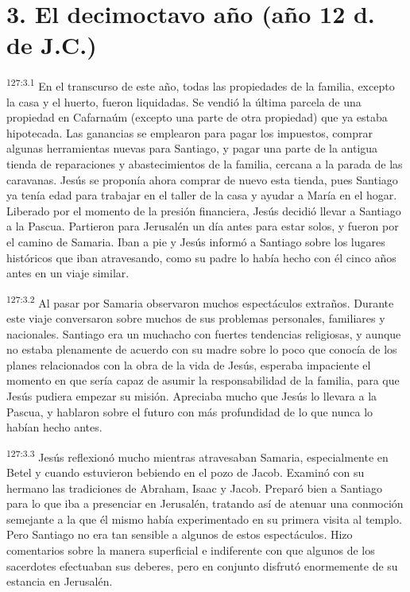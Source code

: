 \section*{3. El decimoctavo año (año 12 d. de J.C.)}
\par
\textsuperscript{127:3.1} En el transcurso de este año, todas las propiedades de la familia, excepto la casa y el huerto, fueron liquidadas. Se vendió la última parcela de una propiedad en Cafarnaúm (excepto una parte de otra propiedad) que ya estaba hipotecada. Las ganancias se emplearon para pagar los impuestos, comprar algunas herramientas nuevas para Santiago, y pagar una parte de la antigua tienda de reparaciones y abastecimientos de la familia, cercana a la parada de las caravanas. Jesús se proponía ahora comprar de nuevo esta tienda, pues Santiago ya tenía edad para trabajar en el taller de la casa y ayudar a María en el hogar. Liberado por el momento de la presión financiera, Jesús decidió llevar a Santiago a la Pascua. Partieron para Jerusalén un día antes para estar solos, y fueron por el camino de Samaria. Iban a pie y Jesús informó a Santiago sobre los lugares históricos que iban atravesando, como su padre lo había hecho con él cinco años antes en un viaje similar.

\par
\textsuperscript{127:3.2} Al pasar por Samaria observaron muchos espectáculos extraños. Durante este viaje conversaron sobre muchos de sus problemas personales, familiares y nacionales. Santiago era un muchacho con fuertes tendencias religiosas, y aunque no estaba plenamente de acuerdo con su madre sobre lo poco que conocía de los planes relacionados con la obra de la vida de Jesús, esperaba impaciente el momento en que sería capaz de asumir la responsabilidad de la familia, para que Jesús pudiera empezar su misión. Apreciaba mucho que Jesús lo llevara a la Pascua, y hablaron sobre el futuro con más profundidad de lo que nunca lo habían hecho antes.

\par
\textsuperscript{127:3.3} Jesús reflexionó mucho mientras atravesaban Samaria, especialmente en Betel y cuando estuvieron bebiendo en el pozo de Jacob. Examinó con su hermano las tradiciones de Abraham, Isaac y Jacob. Preparó bien a Santiago para lo que iba a presenciar en Jerusalén, tratando así de atenuar una conmoción semejante a la que él mismo había experimentado en su primera visita al templo. Pero Santiago no era tan sensible a algunos de estos espectáculos. Hizo comentarios sobre la manera superficial e indiferente con que algunos de los sacerdotes efectuaban sus deberes, pero en conjunto disfrutó enormemente de su estancia en Jerusalén.

